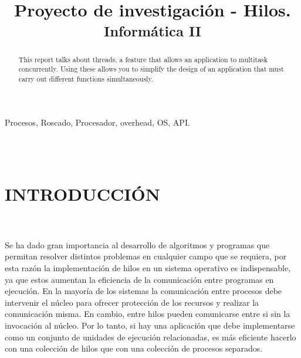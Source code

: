 \documentclass[conference]{IEEEtran}
\begin{document}
\title{Proyecto de investigación - Hilos.
\\
{\footnotesize\textsuperscript{Informática II}
}
}



\author{




}

\maketitle

\begin{abstract}

This report talks about threads, a feature that allows an application to multitask concurrently. Using these allows you to simplify the design of an application that must carry out different functions simultaneously. \\


\end{abstract}

\begin{IEEEkeywords}
Procesos, Roscado, Procesador, overhead, OS, API.
\end{IEEEkeywords}
\\
\\

\section{INTRODUCCIÓN}
\\
\\

Se ha dado gran importancia al desarrollo de algoritmos y programas que permitan resolver distintos problemas en cualquier campo que se requiera, por esta razón la implementación de hilos en un sistema operativo es indispensable, ya que estos aumentan la eficiencia de la comunicación entre programas en ejecución. En la mayoría de los sistemas la comunicación entre procesos debe intervenir el núcleo para ofrecer protección de los recursos y realizar la comunicación misma. En cambio, entre hilos pueden comunicarse entre si sin la invocación al núcleo. Por lo tanto, si hay una aplicación que debe implementarse como un conjunto de unidades de ejecución relacionadas, es más eficiente hacerlo con una colección de hilos que con una colección de procesos separados.
\\
\\
\end{document}
